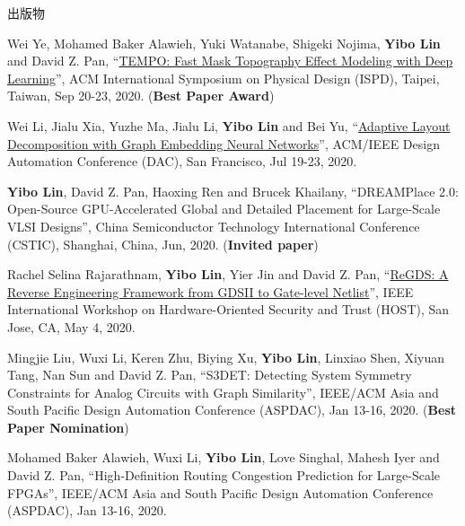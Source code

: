 \begin{rSection}{出版物}
\begin{description}[font=\normalfont, rightmargin=2em]
\item[{[C39]}]{
        Wei Ye, Mohamed Baker Alawieh, Yuki Watanabe, Shigeki Nojima, \textbf{Yibo Lin} and David Z. Pan, 
    ``\href{https://doi.org/10.1145/3372780.3375565}{TEMPO: Fast Mask Topography Effect Modeling with Deep Learning}'', 
    ACM International Symposium on Physical Design (ISPD), Taipei, Taiwan, Sep 20-23, 2020.
    (\textbf{Best Paper Award})
}
            

\item[{[C38]}]{
        Wei Li, Jialu Xia, Yuzhe Ma, Jialu Li, \textbf{Yibo Lin} and Bei Yu, 
    ``\href{https://doi.org/10.1109/DAC18072.2020.9218706}{Adaptive Layout Decomposition with Graph Embedding Neural Networks}'', 
    ACM/IEEE Design Automation Conference (DAC), San Francisco, Jul 19-23, 2020.
    
}
            

\item[{[C37]}]{
        \textbf{Yibo Lin}, David Z. Pan, Haoxing Ren and Brucek Khailany, 
    ``DREAMPlace 2.0: Open-Source GPU-Accelerated Global and Detailed Placement for Large-Scale VLSI Designs'', 
    China Semiconductor Technology International Conference (CSTIC), Shanghai, China, Jun, 2020.
    (\textbf{Invited paper})
}
            

\item[{[C36]}]{
        Rachel Selina Rajarathnam, \textbf{Yibo Lin}, Yier Jin and David Z. Pan, 
    ``\href{https://doi.org/10.1109/HOST45689.2020.9300272}{ReGDS: A Reverse Engineering Framework from GDSII to Gate-level Netlist}'', 
    IEEE International Workshop on Hardware-Oriented Security and Trust (HOST), San Jose, CA, May 4, 2020.
    
}
            

\item[{[C35]}]{
        Mingjie Liu, Wuxi Li, Keren Zhu, Biying Xu, \textbf{Yibo Lin}, Linxiao Shen, Xiyuan Tang, Nan Sun and David Z. Pan, 
    ``S3DET: Detecting System Symmetry Constraints for Analog Circuits with Graph Similarity'', 
    IEEE/ACM Asia and South Pacific Design Automation Conference (ASPDAC), Jan 13-16, 2020.
    (\textbf{Best Paper Nomination})
}
            

\item[{[C34]}]{
        Mohamed Baker Alawieh, Wuxi Li, \textbf{Yibo Lin}, Love Singhal, Mahesh Iyer and David Z. Pan, 
    ``High-Definition Routing Congestion Prediction for Large-Scale FPGAs'', 
    IEEE/ACM Asia and South Pacific Design Automation Conference (ASPDAC), Jan 13-16, 2020.
    
}
\end{description}
\end{rSection}
